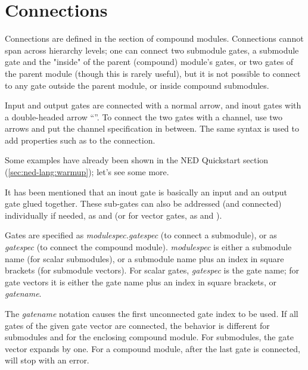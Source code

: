 \section{Connections}
\label{sec:ned-lang:connections}

Connections are defined in the  section of compound
modules. Connections cannot span across hierarchy levels; one can connect
two submodule gates, a submodule gate and the "inside" of the parent
(compound) module's gates, or two gates of the parent module (though this
is rarely useful), but it is not possible to connect to any gate outside the
parent module, or inside compound submodules.

Input and output gates are connected with a normal arrow, and inout gates
with a double-headed arrow ``\ttt{<-{}->}''. To connect the two gates
with a channel, use two arrows and put the channel specification in between.
The same syntax is used to add properties such as  to the
connection.

Some examples have already been shown in the NED Quickstart section
(\ref{sec:ned-lang:warmup}); let's see some more.



It has been mentioned that an inout gate is basically an input and an
output gate glued together. These sub-gates can also be addressed (and
connected) individually if needed, as  and  (or
for vector gates, as  and ).


Gates are specified as \textit{modulespec.gatespec} (to connect a submodule),
or as \textit{gatespec} (to connect the compound module). \textit{modulespec}
is either a submodule name (for scalar submodules), or a submodule name plus
an index in square brackets (for submodule vectors). For scalar gates,
\textit{gatespec} is the gate name; for gate vectors it is either the gate name
plus an index in square brackets, or \textit{gatename}\ttt{++}.

The \textit{gatename}\ttt{++} notation causes the first unconnected gate index
to be used. If all gates of the given gate vector are connected, the behavior
is different for submodules and for the enclosing compound module.
For submodules, the gate vector expands by one. For a compound module,
after the last gate is connected, \ttt{++} will stop with an error.

